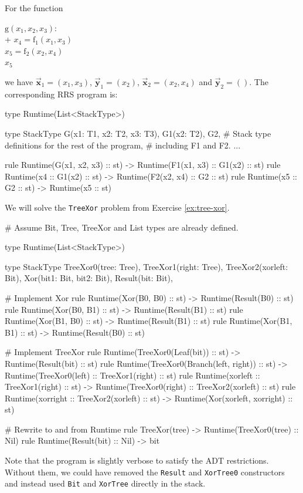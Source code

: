 \documentclass[11pt]{article}
\begin{document}
\begin{example}\label{ex:call-stack}
For the function

\begin{pseudo}
   $\mathrm{g}(x_1, x_2, x_3)$: \\+
    $x_4 = \mathrm{f_1}(x_1, x_3)$ \\
    $x_5 = \mathrm{f_2}(x_2, x_4)$ \\
     $x_5$
\end{pseudo}

\noindent we have $\vec{\bm{x}}_1 = (x_1, x_3)$, $\vec{\bm{y}}_1 = (x_2)$, $\vec{\bm{x}}_2 = (x_2, x_4)$ and
$\vec{\bm{y}}_2 = ()$. The corresponding RRS program is:

\begin{rrscode}
type Runtime(List<StackType>)

type StackType {
  G(x1: T1, x2: T2, x3: T3),
  G1(x2: T2),
  G2,
  # Stack type definitions for the rest of the program,
  # including F1 and F2.
  ...
}

rule Runtime(G(x1, x2, x3) :: st)
  -> Runtime(F1(x1, x3) :: G1(x2) :: st)
rule Runtime(x4 :: G1(x2) :: st)
  -> Runtime(F2(x2, x4) :: G2 :: st)
rule Runtime(x5 :: G2 :: st)
  -> Runtime(x5 :: st)
\end{rrscode}
\end{example}

\begin{example}\label{ex:tree-xor-solution}
We will solve the \lstinline|TreeXor| problem from Exercise \ref{ex:tree-xor}.

\begin{rrscode}
# Assume Bit, Tree, TreeXor and List types are already defined.

type Runtime(List<StackType>)

type StackType {
  TreeXor0(tree: Tree),
  TreeXor1(right: Tree),
  TreeXor2(xorleft: Bit),
  Xor(bit1: Bit, bit2: Bit),
  Result(bit: Bit),
}

# Implement Xor
rule Runtime(Xor(B0, B0) :: st) -> Runtime(Result(B0) :: st)
rule Runtime(Xor(B0, B1) :: st) -> Runtime(Result(B1) :: st)
rule Runtime(Xor(B1, B0) :: st) -> Runtime(Result(B1) :: st)
rule Runtime(Xor(B1, B1) :: st) -> Runtime(Result(B0) :: st)

# Implement TreeXor
rule Runtime(TreeXor0(Leaf(bit)) :: st)
  -> Runtime(Result(bit) :: st)
rule Runtime(TreeXor0(Branch(left, right)) :: st)
  -> Runtime(TreeXor0(left) :: TreeXor1(right) :: st)
rule Runtime(xorleft :: TreeXor1(right) :: st)
  -> Runtime(TreeXor0(right) :: TreeXor2(xorleft) :: st)
rule Runtime(xorright :: TreeXor2(xorleft) :: st)
  -> Runtime(Xor(xorleft, xorright) :: st)

# Rewrite to and from Runtime
rule TreeXor(tree) -> Runtime(TreeXor0(tree) :: Nil)
rule Runtime(Result(bit) :: Nil) -> bit
\end{rrscode}

Note that the program is slightly verbose to satisfy the ADT restrictions.
Without them, we could have removed the \lstinline|Result| and
\lstinline|XorTree0| constructors and instead used \lstinline|Bit|
and \lstinline|XorTree| directly in the stack.
\end{example}
\end{document}
